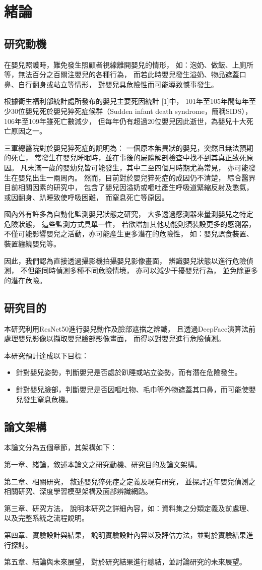 \documentclass[class=NCU_thesis, crop=false]{standalone}
\begin{document}
\chapter{緒論}
\section{研究動機}
在嬰兒照護時，難免發生照顧者視線離開嬰兒的情形，
如：泡奶、做飯、上廁所等，無法百分之百關注嬰兒的各種行為，
而若此時嬰兒發生溢奶、物品遮蓋口鼻、自行翻身或站立等情形，
對嬰兒具危險性而可能導致憾事發生。

根據衛生福利部統計處所發布的嬰兒主要死因統計 [1]中，
101年至105年間每年至少30位嬰兒死於嬰兒猝死症候群（Sudden infant death syndrome，簡稱SIDS），
106年至109年雖死亡數減少，
但每年仍有超過20位嬰兒因此逝世，為嬰兒十大死亡原因之一。

三軍總醫院對於嬰兒猝死症的說明為：
一個原本無異狀的嬰兒，突然且無法預期的死亡，
常發生在嬰兒睡眠時，並在事後的屍體解剖檢查中找不到其真正致死原因。
凡未滿一歲的嬰幼兒皆可能發生，其中二至四個月時期尤為常見，
亦可能發生在嬰兒出生一兩周內。
然而，目前對於嬰兒猝死症的成因仍不清楚，
綜合醫界目前相關因素的研究中，
包含了嬰兒因溢奶或嘔吐產生呼吸道緊縮反射及憋氣，
或因翻身、趴睡致使呼吸困難，
而窒息死亡等原因。

國內外有許多為自動化監測嬰兒狀態之研究，
大多透過感測器來量測嬰兒之特定危險狀態，
這些監測方式具單一性，
若欲增加其他功能則須裝設更多的感測器，
不僅可能影響嬰兒之活動，亦可能產生更多潛在的危險性，
如：嬰兒誤食裝置、裝置纏繞嬰兒等。

因此，我們認為直接透過攝影機拍攝嬰兒影像畫面，
辨識嬰兒狀態以進行危險偵測，
不但能同時偵測多種不同危險情境，
亦可以減少干擾嬰兒行為，
並免除更多的潛在危險。


\section{研究目的}
本研究利用ResNet50進行嬰兒動作及臉部遮擋之辨識，
且透過DeepFace演算法前處理嬰兒影像以擷取嬰兒臉部影像畫面，
而得以對嬰兒進行危險偵測。

本研究預計達成以下目標：
\begin{itemize}
    \item 針對嬰兒姿勢，判斷嬰兒是否處於趴睡或站立姿勢，而有潛在危險發生。
    \item 針對嬰兒臉部，判斷嬰兒是否因嘔吐物、毛巾等外物遮蓋其口鼻，而可能使嬰兒發生窒息危機。
\end{itemize}

\section{論文架構}
本論文分為五個章節，其架構如下：

第一章、緒論，敘述本論文之研究動機、研究目的及論文架構。

第二章、相關研究，
敘述嬰兒猝死症之定義及現有研究，
並探討近年嬰兒偵測之相關研究、深度學習模型架構及面部辨識網路。

第三章、研究方法，
說明本研究之詳細內容，如：資料集之分類定義及前處理、以及完整系統之流程說明。

第四章、實驗設計與結果，
說明實驗設計內容以及評估方法，並對於實驗結果進行探討。

第五章、結論與未來展望，
對於研究結果進行總結，並討論研究的未來展望。
\end{document}
